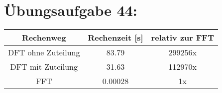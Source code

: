 

	\section*{Übungsaufgabe 44:}

	\begin{tabular}{|c|c|c|}
		\hline
		Rechenweg & Rechenzeit [s] & relativ zur FFT \\ \hline
		DFT ohne Zuteilung & 83.79 & 299256x \\ \hline
		DFT mit Zuteilung & 31.63 & 112970x \\ \hline
		FFT & 0.00028 & 1x \\ \hline
	\end{tabular}
	
